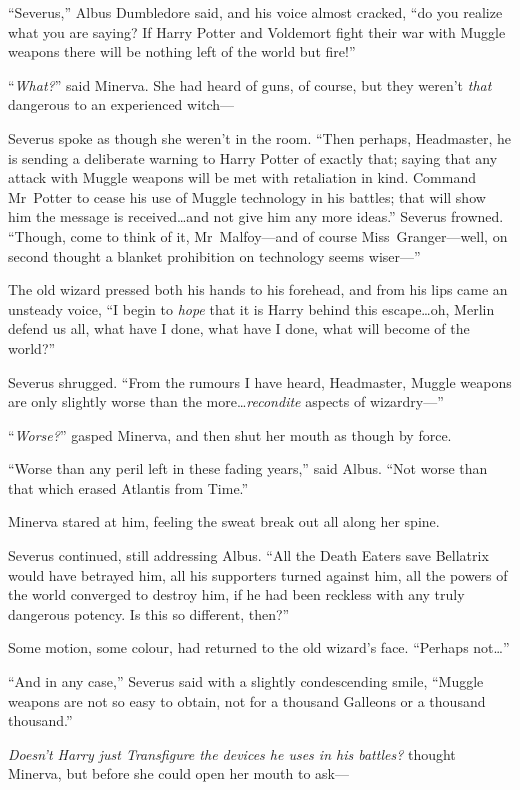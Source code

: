 “Severus,” Albus Dumbledore said, and his voice almost cracked, “do you realize what you are saying? If Harry Potter and Voldemort fight their war with Muggle weapons there will be nothing left of the world but fire!”

“\emph{What?}” said Minerva. She had heard of guns, of course, but they weren’t \emph{that} dangerous to an experienced witch—

Severus spoke as though she weren’t in the room.
“Then perhaps, Headmaster, he is sending a deliberate warning to Harry Potter of exactly that; saying that any attack with Muggle weapons will be met with retaliation in kind. Command Mr~Potter to cease his use of Muggle technology in his battles; that will show him the message is received…and not give him any more ideas.” Severus frowned.
“Though, come to think of it, Mr~Malfoy—and of course Miss~Granger—well, on second thought a blanket prohibition on technology seems wiser—”

The old wizard pressed both his hands to his forehead, and from his lips came an unsteady voice,
“I begin to \emph{hope} that it is Harry behind this escape…oh, Merlin defend us all, what have I done, what have I done, what will become of the world?”

Severus shrugged.
“From the rumours I have heard, Headmaster, Muggle weapons are only slightly worse than the more…\emph{recondite} aspects of wizardry—”

“\emph{Worse?}” gasped Minerva, and then shut her mouth as though by force.

“Worse than any peril left in these fading years,” said Albus.
“Not worse than that which erased Atlantis from Time.”

Minerva stared at him, feeling the sweat break out all along her spine.

Severus continued, still addressing Albus.
“All the Death Eaters save Bellatrix would have betrayed him, all his supporters turned against him, all the powers of the world converged to destroy him, if he had been reckless with any truly dangerous potency. Is this so different, then?”

Some motion, some colour, had returned to the old wizard’s face.
“Perhaps not…”

“And in any case,” Severus said with a slightly condescending smile,
“Muggle weapons are not so easy to obtain, not for a thousand Galleons or a thousand thousand.”

\emph{Doesn’t Harry just Transfigure the devices he uses in his battles?} thought Minerva, but before she could open her mouth to ask—

